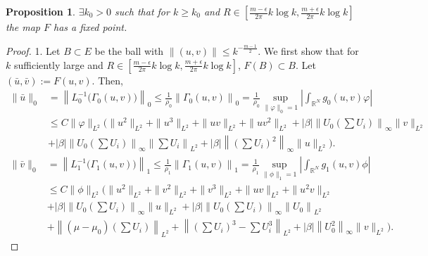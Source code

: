 \documentclass[a4paper,11pt]{article}
\def\blue{\color{blue}}
\def\blue{\color{blue}}
\newtheorem{proposition}{Proposition}[section]
\numberwithin{step}{dummy}
\begin{document}
\begin{proposition} $\exists k_0>0$ such that for $k\ge k_0$ and $R \in \left[\frac{m-\epsilon}{2\pi}k\log k, \frac{m+\epsilon}{2\pi}k\log k\right]$ the map $F$ has a fixed point.
 \end{proposition}
\begin{proof}
1. Let $B \subset E$ be the ball with {\blue $\|(u,v)\| \le k^{-\frac{m-1}{2}}$}. We first show that for $k$ sufficiently large and $R \in \left[\frac{m-\epsilon}{2\pi}k\log k, \frac{m+\epsilon}{2\pi}k\log k\right]$, $F(B) \subset B$. Let $(\bar u, \bar v) := F(u,v)$. Then,
 \begin{align*}
  \|\bar u\|_0 &= \left\|L_0^{-1}\Big(\Gamma_0(u,v)\Big)\right\|_0 \le \frac{1}{\rho_0}\left\|\Gamma_0(u,v)\right\|_0 = \frac{1}{\rho_0} \sup_{\|\varphi\|_0=1} \left| \int_{ \mathbb{R}^N} g_0(u,v) \varphi \right|\\
  &\le C\|\varphi\|_{L^2} \Big(\|u^2\|_{L^2} + \|u^3\|_{L^2} + \|uv\|_{L^2} +\|uv^2\|_{L^2} + |\beta| \left\|U_0\left(\sum U_i\right)\right\|_{\infty}\|v\|_{L^2}\\
  & + |\beta|\left\|U_0\left(\sum U_i\right)\right\|_{\infty}\left\|\sum U_i\right\|_{L^2} + |\beta| \left\|\left(\sum U_i\right)^2\right\|_\infty \|u\|_{L^2}\Big).
 \end{align*}
 \begin{align*}
  \|\bar v\|_0 &= \left\|L_1^{-1}\Big(\Gamma_1(u,v)\Big)\right\|_1 \le \frac{1}{\rho_1}\left\|\Gamma_1(u,v)\right\|_1 = \frac{1}{\rho_1} \sup_{\|\phi\|_1=1} \left| \int_{ \mathbb{R}^N} g_1(u,v) \phi \right|\\
  &\le C\|\phi\|_{L^2} \Big(\|u^2\|_{L^2} + \|v^2\|_{L^2}+ \|v^3\|_{L^2} + \|uv\|_{L^2} +\|u^2v\|_{L^2} \\
  &+ |\beta| \left\|U_0\left(\sum U_i\right)\right\|_{\infty}\|u\|_{L^2} + |\beta|\left\|U_0\left(\sum U_i\right)\right\|_{\infty}\left\|U_0\right\|_{L^2} \\
  & + \left\|(\mu-\mu_0)\left(\sum U_i\right)\right\|_{L^2} + \left\| \left(\sum U_i\right)^3 - \sum U_i^3 \right\|_{L^2} + |\beta| \left\|U_0^2\right\|_\infty \|v\|_{L^2}\Big).
 \end{align*}

\end{proof}
\end{document}
